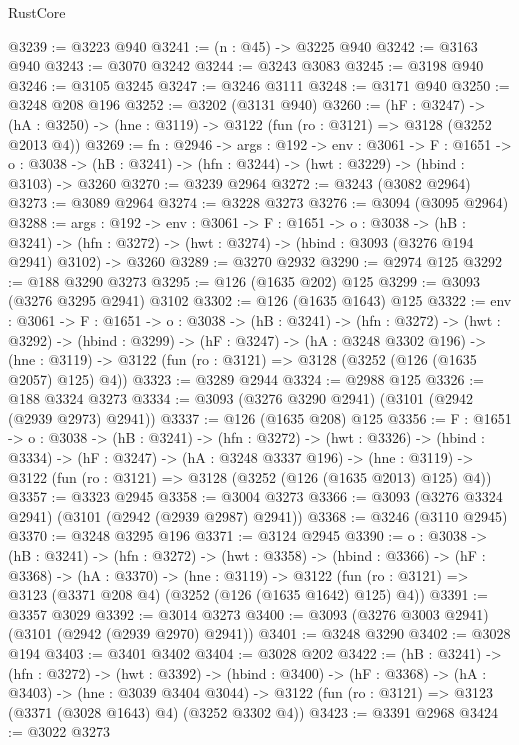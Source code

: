 \begin{lexlean}{RustCore}
\begin{coremodule}
@3239 := @3223 @940
@3241 := (n : @45) -> @3225 @940
@3242 := @3163 @940
@3243 := @3070 @3242
@3244 := @3243 @3083
@3245 := @3198 @940
@3246 := @3105 @3245
@3247 := @3246 @3111
@3248 := @3171 @940
@3250 := @3248 @208 @196
@3252 := @3202 (@3131 @940)
@3260 := (hF : @3247) ->
  (hA : @3250) -> (hne : @3119) -> @3122 (fun (ro : @3121) => @3128 (@3252 @2013 @4))
@3269 := {fn : @2946} ->
  {args : @192} ->
  {env : @3061} ->
  {F : @1651} ->
  {o : @3038} -> (hB : @3241) -> (hfn : @3244) -> (hwt : @3229) -> (hbind : @3103) -> @3260
@3270 := @3239 @2964
@3272 := @3243 (@3082 @2964)
@3273 := @3089 @2964
@3274 := @3228 @3273
@3276 := @3094 (@3095 @2964)
@3288 := {args : @192} ->
  {env : @3061} ->
  {F : @1651} ->
  {o : @3038} ->
  (hB : @3241) ->
  (hfn : @3272) -> (hwt : @3274) -> (hbind : @3093 (@3276 @194 @2941) @3102) -> @3260
@3289 := @3270 @2932
@3290 := @2974 @125
@3292 := @188 @3290 @3273
@3295 := @126 (@1635 @202) @125
@3299 := @3093 (@3276 @3295 @2941) @3102
@3302 := @126 (@1635 @1643) @125
@3322 := {env : @3061} ->
  {F : @1651} ->
  {o : @3038} ->
  (hB : @3241) ->
  (hfn : @3272) ->
  (hwt : @3292) ->
  (hbind : @3299) ->
  (hF : @3247) ->
  (hA : @3248 @3302 @196) ->
  (hne : @3119) -> @3122 (fun (ro : @3121) => @3128 (@3252 (@126 (@1635 @2057) @125) @4))
@3323 := @3289 @2944
@3324 := @2988 @125
@3326 := @188 @3324 @3273
@3334 := @3093 (@3276 @3290 @2941) (@3101 (@2942 (@2939 @2973) @2941))
@3337 := @126 (@1635 @208) @125
@3356 := {F : @1651} ->
  {o : @3038} ->
  (hB : @3241) ->
  (hfn : @3272) ->
  (hwt : @3326) ->
  (hbind : @3334) ->
  (hF : @3247) ->
  (hA : @3248 @3337 @196) ->
  (hne : @3119) -> @3122 (fun (ro : @3121) => @3128 (@3252 (@126 (@1635 @2013) @125) @4))
@3357 := @3323 @2945
@3358 := @3004 @3273
@3366 := @3093 (@3276 @3324 @2941) (@3101 (@2942 (@2939 @2987) @2941))
@3368 := @3246 (@3110 @2945)
@3370 := @3248 @3295 @196
@3371 := @3124 @2945
@3390 := {o : @3038} ->
  (hB : @3241) ->
  (hfn : @3272) ->
  (hwt : @3358) ->
  (hbind : @3366) ->
  (hF : @3368) ->
  (hA : @3370) ->
  (hne : @3119) ->
  @3122 (fun (ro : @3121) => @3123 (@3371 @208 @4) (@3252 (@126 (@1635 @1642) @125) @4))
@3391 := @3357 @3029
@3392 := @3014 @3273
@3400 := @3093 (@3276 @3003 @2941) (@3101 (@2942 (@2939 @2970) @2941))
@3401 := @3248 @3290
@3402 := @3028 @194
@3403 := @3401 @3402
@3404 := @3028 @202
@3422 := (hB : @3241) ->
  (hfn : @3272) ->
  (hwt : @3392) ->
  (hbind : @3400) ->
  (hF : @3368) ->
  (hA : @3403) ->
  (hne : @3039 @3404 @3044) ->
  @3122 (fun (ro : @3121) => @3123 (@3371 (@3028 @1643) @4) (@3252 @3302 @4))
@3423 := @3391 @2968
@3424 := @3022 @3273

\end{coremodule}
\end{lexlean}

